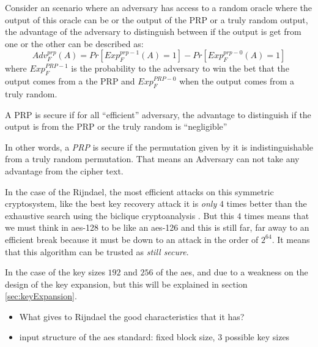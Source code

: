 \documentclass[10pt,a4paper,twoside]{llncs}
\begin{document}
Consider an scenario where an adversary has access to a random oracle where the output of this oracle can be or the output of the PRP or a truly random output, the advantage of the adversary to distinguish between if the output is get from one or the other can be described as:
\begin{equation}\label{eq:prpAdv}
 {Adv}_{F}^{prp}(A) = Pr[{Exp}_{F}^{prp-1}(A)=1]-Pr[{Exp}_{F}^{prp-0}(A)=1]
\end{equation}
where ${Exp}_{F}^{PRP-1}$ is the probability to the adversary to win the bet that the output comes from a the PRP and ${Exp}_{F}^{PRP-0}$ when the output comes from a truly random.

\begin{definition}\label{def:securePRP}
 A PRP is secure if for all ``efficient'' adversary, the advantage to distinguish if the output is from the PRP or the truly random is ``negligible''
\end{definition}

In other words, a \emph{PRP} is secure if the permutation given by it is indistinguishable from a truly random permutation. That means an Adversary can not take any advantage from the cipher text.

In the case of the Rijndael, the most efficient attacks on this symmetric cryptosystem, like the best key recovery attack it is \emph{only} $4$ times better than the exhaustive search using the biclique cryptoanalysis \cite{biclique-fullaes}. But this $4$ times means that we must think in aes-128 to be like an aes-126 and this is still far, far away to an efficient break because it must be down to an attack in the order of $2^{64}$. It means that this algorithm can be trusted as \emph{still secure}.

In the case of the key sizes $192$ and $256$ of the aes, and due to a weakness on the design of the key expansion, but this will be explained in section \ref{sec:keyExpansion}.

\begin{itemize}
 \item What gives to Rijndael the good characteristics that it has?
\end{itemize}

\begin{itemize}
 \item input structure of the aes standard: fixed block size, 3 possible key sizes
\end{itemize}
\end{document}
